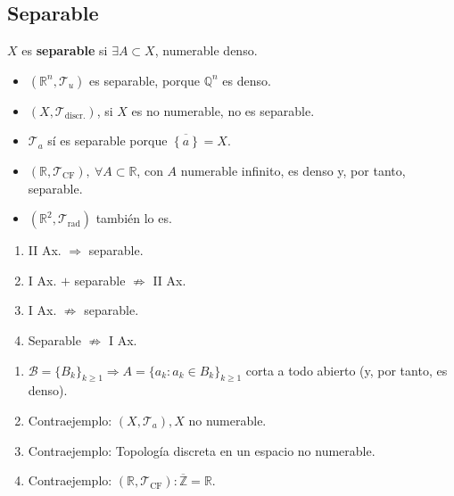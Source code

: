 \subsection{Separable}%
\label{sub:separable}
\begin{defi}[Separable]
$X$ es \textbf{separable} si $\exists A \subset X$, numerable denso.
\end{defi}

\begin{ej}
\begin{itemize}
    \item $\left( \mathbb{R}^n, \mathcal{T}_u \right)$ es separable, porque $\mathbb{Q}^n$ es denso.
    \item $\left( X, \mathcal{T}_{\text{discr.}} \right)$, si $X$ es no numerable, no es separable.
    \item $\mathcal{T}_a$ sí es separable porque $\overline{\left\{ a \right\}} = X$.
    \item $\left( \mathbb{R}, \mathcal{T}_{\text{CF}} \right),\ \forall A \subset \mathbb{R}$, con $A$ numerable infinito, es denso y, por tanto, separable. 
    \item $\left( \mathbb{R}^2, \mathcal{T}_{\text{rad}} \right)$ también lo es. %
\end{itemize}
\end{ej}

\begin{prop}
\begin{enumerate}
    \item II Ax. $\Rightarrow$ separable. 
    \item I Ax. $+$ separable $\not \Rightarrow$ II Ax. 
    \item I Ax. $\not \Rightarrow$ separable. 
    \item Separable $\not \Rightarrow$ I Ax. 
\end{enumerate}
\end{prop}
\begin{demo}
\begin{enumerate}
    \item $\mathcal{B} = \{B_k\}_{k \ge 1} \Rightarrow A = \{a_k : a_k \in B_k\}_{k \ge 1}$ corta a todo abierto (y, por tanto, es denso).
    \item Contraejemplo: $\left( X, \mathcal{T}_a \right), X$ no numerable.
    \item Contraejemplo: Topología discreta en un espacio no numerable.
    \item Contraejemplo: $\left( \mathbb{R}, \mathcal{T}_{\text{CF}} \right) : \overline{\mathbb{Z}} = \mathbb{R}$.
\end{enumerate}
\end{demo}

